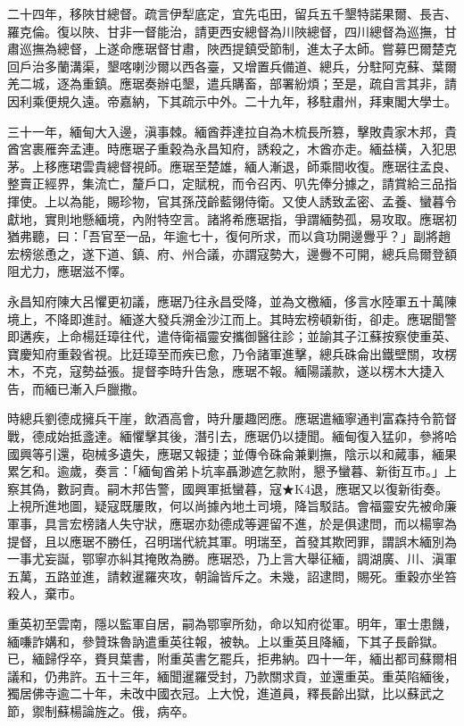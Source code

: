 \begin{pinyinscope}
二十四年，移陜甘總督。疏言伊犁底定，宜先屯田，留兵五千墾特諾果爾、長吉、羅克倫。復以陜、甘非一督能治，請更西安總督為川陜總督，四川總督為巡撫，甘肅巡撫為總督，上遂命應琚督甘肅，陜西提鎮受節制，進太子太師。嘗募巴爾楚克回戶治多蘭溝渠，墾喀喇沙爾以西各臺，又增置兵備道、總兵，分駐阿克蘇、葉爾羌二城，逐為重鎮。應琚奏辦屯墾，遣兵購畜，部署紛煩；至是，疏自言其非，請因利乘便規久遠。帝嘉納，下其疏示中外。二十九年，移駐肅州，拜東閣大學士。

三十一年，緬甸大入邊，滇事棘。緬酋莽達拉自為木梳長所篡，擊敗貴家木邦，貴酋宮裹雁奔孟連。時應琚子重穀為永昌知府，誘殺之，木酋亦走。緬益橫，入犯思茅。上移應珺雲貴總督視師。應琚至楚雄，緬人漸退，師乘間收復。應琚往孟良、整賣正經界，集流亡，釐戶口，定賦稅，而令召丙、叭先俸分據之，請賞給三品指揮使。上以為能，賜珍物，官其孫茂齡藍翎侍衛。又使人誘致孟密、孟養、蠻暮令獻地，實則地懸緬境，內附特空言。諸將希應琚指，爭謂緬勢孤，易攻取。應琚初猶弗聽，曰：「吾官至一品，年逾七十，復何所求，而以貪功開邊釁乎？」副將趙宏榜慫恿之，遂下道、鎮、府、州合議，亦謂寇勢大，邊釁不可開，總兵烏爾登額阻尤力，應琚滋不懌。

永昌知府陳大呂懼更初議，應琚乃往永昌受降，並為文檄緬，侈言水陸軍五十萬陳境上，不降即進討。緬遂大發兵溯金沙江而上。其時宏榜頓新街，卻走。應琚聞警即遘疾，上命楊廷璋往代，遣侍衛福靈安攜御醫往診；並諭其子江蘇按察使重英、寶慶知府重穀省視。比廷璋至而疾已愈，乃令諸軍進擊，總兵硃侖出鐵壁關，攻楞木，不克，寇勢益張。提督李時升告急，應琚不報。緬陽議款，遂以楞木大捷入告，而緬已漸入戶臘撒。

時總兵劉德成擁兵干崖，飲酒高會，時升屢趣罔應。應琚遣緬寧通判富森持令箭督戰，德成始抵盞達。緬懼擊其後，潛引去，應琚仍以捷聞。緬甸復入猛卯，參將哈國興等引還，砲械多遺失，應琚又報捷；並傳令硃侖兼剿撫，陰示以和蕆事，緬果累乞和。逾歲，奏言：「緬甸酋弟卜坑率聶渺遮乞款附，懇予蠻暮、新街互市。」上察其偽，數訶責。嗣木邦告警，國興軍抵蠻暮，寇★K4退，應琚又以復新街奏。上視所進地圖，疑寇既屢敗，何以尚據內地土司境，降旨駁詰。會福靈安先被命廉軍事，具言宏榜諸人失守狀，應琚亦劾德成等遲留不進，於是俱逮問，而以楊寧為提督，且以應琚不勝任，召明瑞代統其軍。明瑞至，首發其欺罔罪，謂誤木緬別為一事尤妄誕，鄂寧亦糾其掩敗為勝。應琚恐，乃上言大舉征緬，調湖廣、川、滇軍五萬，五路並進，請敕暹羅夾攻，朝論皆斥之。未幾，詔逮問，賜死。重穀亦坐笞殺人，棄市。

重英初至雲南，隱以監軍自居，嗣為鄂寧所劾，命以知府從軍。明年，軍士患饑，緬嗛詐媾和，參贊珠魯訥遣重英往報，被執。上以重英且降緬，下其子長齡獄。已，緬歸俘卒，賚貝葉書，附重英書乞罷兵，拒弗納。四十一年，緬出都司蘇爾相議和，仍弗許。五十三年，緬聞暹羅受封，乃款關求貢，並還重英。重英陷緬後，獨居佛寺逾二十年，未改中國衣冠。上大悅，進道員，釋長齡出獄，比以蘇武之節，禦制蘇楊論旌之。俄，病卒。


\end{pinyinscope}
